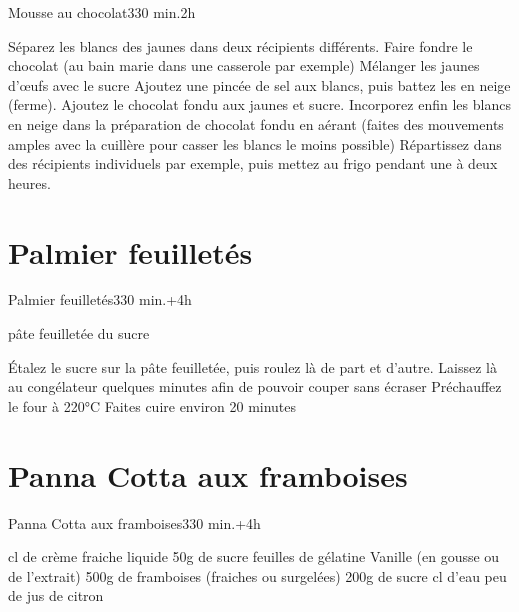 {\begin{recette}{Mousse au chocolat}{3}{30 min.}{2h}
\begin{preparation}
\etape Séparez les blancs des jaunes dans deux récipients différents.
\etape Faire fondre le chocolat (au bain marie dans une casserole par exemple)
\etape Mélanger les jaunes d'œufs avec le sucre
\etape Ajoutez une pincée de sel aux blancs, puis battez les en neige (ferme).
\etape Ajoutez le chocolat fondu aux jaunes et sucre.
\etape Incorporez enfin les blancs en neige dans la préparation de chocolat fondu en aérant (faites des mouvements amples avec 
la cuillère pour casser les blancs le moins possible)
\etape Répartissez dans des récipients individuels par exemple, puis mettez au frigo pendant une à deux heures.
\end{preparation}
\end{recette}


\section{Palmier feuilletés}
\begin{recette}{Palmier feuilletés}{3}{30 min.+4h}{}
\begin{ingredients}
 pâte feuilletée
\ingredient du sucre
\end{ingredients}

\begin{preparation}
\etape Étalez le sucre sur la pâte feuilletée, puis roulez là de part et d'autre. 
\etape Laissez là au congélateur quelques minutes afin de pouvoir couper sans écraser
\etape Préchauffez le four à 220°C
\etape Faites cuire environ 20 minutes
\end{preparation}
\end{recette}

\section{Panna Cotta aux framboises}
\begin{recette}{Panna Cotta aux framboises}{3}{30 min.+4h}{}
\begin{ingredients}
 cl de crème fraiche liquide
\ingredient 50g de sucre
 feuilles de gélatine
\ingredient Vanille (en gousse ou de l'extrait)
\ingredient[Coulis]
\ingredient 500g de framboises (fraiches ou surgelées)
\ingredient 200g de sucre
 cl d'eau
 peu de jus de citron
\end{ingredients}


\end{recette}}
